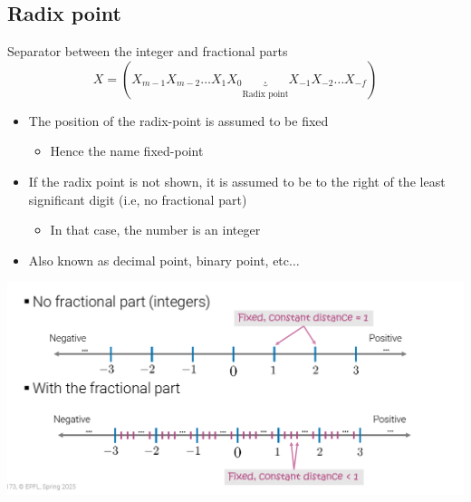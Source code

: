 \subsection{Radix point}
\begin{parag}{Separator between the integer and fractional parts}
    \[X = (X_{m-1}X_{m-2}\dots X_1X_0\underbrace{.}_{\text{Radix point}}X_{-1}X_{-2}\dots X_{-f})\]
    \begin{itemize}
        \item The position of the radix-point is assumed to be fixed
        \begin{itemize}
            \item Hence the name fixed-point
        \end{itemize}
        \item If the radix point is not shown, it is assumed to be to the right of the least significant digit (i.e, no fractional part)
        \begin{itemize}
            \item In that case, the number is an integer
        \end{itemize}
        \item Also known as decimal point, binary point, etc$\dots$
    \end{itemize}
\end{parag}
\begin{center}
\includegraphics[scale=0.5]{Screenshot 2025-02-24 131346.png}
\end{center}

